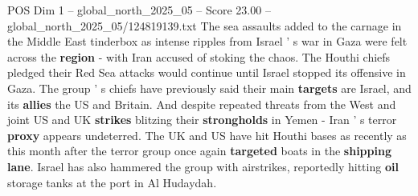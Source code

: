 \begin{textsample}{POS Dim 1 – global\_north\_2025\_05 – Score 23.00 – global\_north\_2025\_05/124819139.txt}
The sea assaults added to the carnage in the Middle East tinderbox as intense ripples from Israel ' s war in Gaza were felt across the \textbf{region} - with Iran accused of stoking the chaos.
The Houthi chiefs pledged their Red Sea attacks would continue until Israel stopped its offensive in Gaza.
The group ' s chiefs have previously said their main \textbf{targets} are Israel, and its \textbf{allies} the US and Britain.
And despite repeated threats from the West and joint US and UK \textbf{strikes} blitzing their \textbf{strongholds} in Yemen - Iran ' s terror \textbf{proxy} appears undeterred.
The UK and US have hit Houthi bases as recently as this month after the terror group once again \textbf{targeted} boats in the \textbf{shipping} \textbf{lane}.
Israel has also hammered the group with airstrikes, reportedly hitting \textbf{oil} storage tanks at the port in Al Hudaydah.

\end{textsample}
